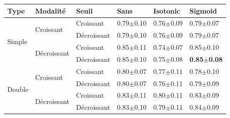 \begin{table}[H]
    \begin{tabular}{llllll}
        \toprule 
        Type                    & Modalité                          & Seuil             & Sans                  & Isotonic              & Sigmoid               \\ \midrule
        \multirow{4}{*}{Simple} & \multirow{2}{*}{Croissant}        & Croissant         & 0.79$\pm$0.10         & 0.76$\pm$0.09         & 0.79$\pm$0.07         \\ \cline{3-6}
                                &                                   & Décroissant       & 0.79$\pm$0.10         & 0.76$\pm$0.09         & 0.79$\pm$0.07         \\ \cline{2-6}
                                & \multirow{2}{*}{Décroissant}      & Croissant         & 0.85$\pm$0.11         & 0.74$\pm$0.07         & 0.85$\pm$0.10         \\ \cline{3-6}
                                &                                   & Décroissant       & 0.85$\pm$0.10         & 0.75$\pm$0.08         & \textbf{0.85$\pm$0.08}\\ \cline{1-6}
        \multirow{4}{*}{Double} & \multirow{2}{*}{Croissant}        & Croissant         & 0.80$\pm$0.07         & 0.77$\pm$0.11         & 0.78$\pm$0.10         \\ \cline{3-6}
                                &                                   & Décroissant       & 0.80$\pm$0.07         & 0.76$\pm$0.11         & 0.79$\pm$0.09         \\ \cline{2-6}
                                & \multirow{2}{*}{Décroissant}      & Croissant         & 0.83$\pm$0.11         & 0.80$\pm$0.11         & 0.83$\pm$0.09         \\ \cline{3-6}
                                &                                   & Décroissant       & 0.83$\pm$0.10         & 0.79$\pm$0.11         & 0.84$\pm$0.09         \\ \bottomrule    
    \end{tabular}
\end{table}


